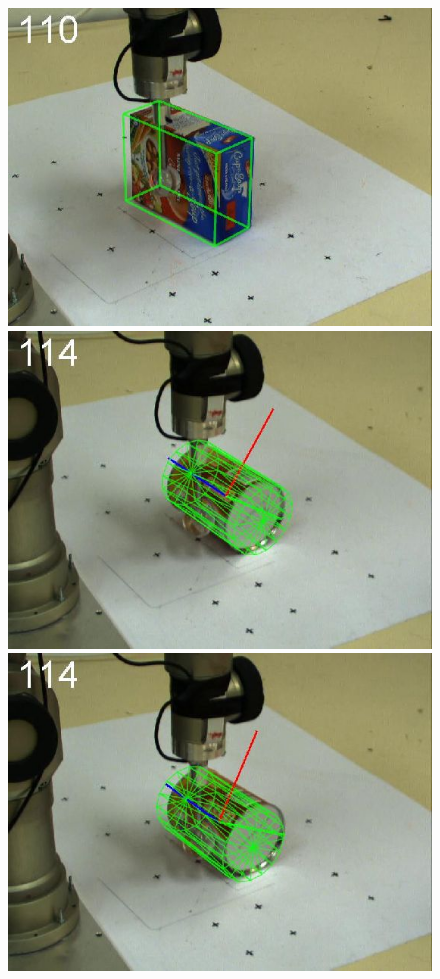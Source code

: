 \begin{figure}[htbp]
{\includegraphics[width=\imgAXwid]{images/A2_2exp_87_2}
\includegraphics[width=\imgAXwid]{images/A3_2exp_39_2}
\includegraphics[width=\imgAXwid]{images/A3_LWPR1_39_2}
}
\end{figure}

